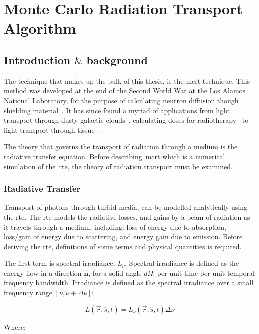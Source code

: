\section{Monte Carlo Radiation Transport Algorithm}

\subsection{Introduction \texorpdfstring{$\&$}{and} background}
The technique that makes up the bulk of this thesis, is the \gls*{mcrt} technique. This method was developed at the end of the Second World War at the Los Alamos National Laboratory, for the purpose of calculating neutron diffusion though shielding material~\cite{montybeg1,eckhardt1987stan,anderson1986metropolis,ulam1947statistical}. It has since found a myriad of applications from light transport through dusty galactic clouds~\cite{wood1999model}, calculating doses for radiotherapy~\cite{rogers1995beam} to light transport through tissue~\cite{1stmonty}.

The theory that governs the transport of radiation through a medium is the radiative transfer equation.
Before describing~\gls*{mcrt} which is a numerical simulation of the~\gls*{rte}, the theory of radiation transport must be examined.

\subsubsection*{Radiative Transfer}
Transport of photons through turbid media, can be modelled analytically using the \gls*{rte}. The \gls*{rte} models the radiative losses, and gains by a beam of radiation as it travels through a medium, including: loss of energy due to absorption, loss/gain of energy due to scattering, and energy gain due to emission. Before deriving the \gls*{rte}, definitions of some terms and physical quantities is required.


The first term is spectral irradiance, $L_\nu$. Spectral irradiance is defined as the energy flow in a direction $\mathbf{\hat{n}}$, for a solid angle $d\Omega$, per unit time per unit temporal frequency bandwidth.	
Irradiance is defined as the spectral irradiance over a small frequency range $[\nu, \nu+\Delta \nu]$:

\begin{equation}
	L(\vec{r},\hat{s},t) = L_{\nu}(\vec{r},\hat{s},t)\Delta \nu	
\end{equation}

\noindent Where:

